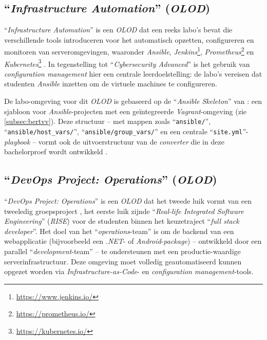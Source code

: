 \subsection{``\emph{Infrastructure Automation}'' (\emph{OLOD})}%
\label{subsec:infra_auto}

``\emph{Infrastructure Automation}'' is een \emph{OLOD} dat een reeks labo's bevat die verschillende tools introduceren voor het automatisch opzetten, configureren en monitoren van serveromgevingen, waaronder \emph{Ansible}, \emph{Jenkins}\footnote{\url{https://www.jenkins.io/}}, \emph{Prometheus}\footnote{\url{https://prometheus.io/}} en \emph{Kubernetes}\footnote{\url{https://kubernetes.io/}} \autocite{HOGENT2025a}. In tegenstelling tot ``\emph{Cybersecurity Advanced}'' is het gebruik van \emph{configuration management} hier een centrale leerdoelstelling: de labo's vereisen dat studenten \emph{Ansible} inzetten om de virtuele machines te configureren.

De labo-omgeving voor dit \emph{OLOD} is gebaseerd op de ``\emph{Ansible Skeleton}'' van \textcite{Vreckem2025}: een sjabloon voor \emph{Ansible}-projecten met een geïntegreerde \emph{Vagrant}-omgeving (zie \autoref{subsec:bertvv}). Deze structuur -- met mappen zoals ``\texttt{ansible/}'', ``\texttt{ansible/host\_vars/}'', ``\texttt{ansible/group\_vars/}'' en een centrale ``\texttt{site.yml}''-\emph{playbook} -- vormt ook de uitvoerstructuur van de \emph{converter} die in deze bachelorproef wordt ontwikkeld \autocite{HoGentTIN2025a}.

\subsection{``\emph{DevOps Project: Operations}'' (\emph{OLOD})}%
\label{subsec:devops_ops}

``\emph{DevOps Project: Operations}'' is een \emph{OLOD} dat het tweede luik vormt van een tweeledig groepsproject \autocite{HOGENT2025b}, het eerste luik zijnde ``\emph{Real-life Integrated Software Engineering}'' (\emph{RISE}) voor de studenten binnen het keuzetraject ``\emph{full stack developer}''.
Het doel van het ``\emph{operations}-team'' is om de backend van een webapplicatie (bijvoorbeeld een \emph{.NET}- of \emph{Android}-\emph{package}) -- ontwikkeld door een parallel ``\emph{development}-team'' -- te ondersteunen met een productie-waardige serverinfrastructuur. Deze omgeving moet volledig geautomatiseerd kunnen opgezet worden via \emph{Infrastructure-as-Code}- en \emph{configuration management}-tools.

